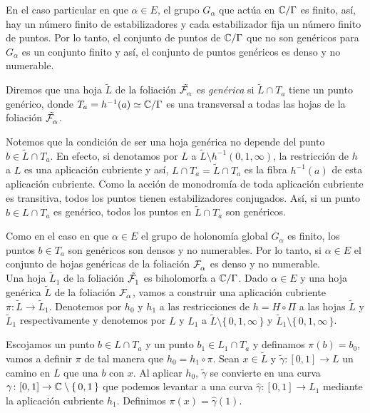 En el caso particular en que $\alpha\in E$, el grupo $G_{\alpha}$ que actúa en $\mathbb{C}/\Gamma$ es finito, así, hay un número finito de estabilizadores y cada estabilizador fija un número finito de puntos. Por lo tanto, el conjunto de puntos de $\mathbb{C}/\Gamma$ que no son genéricos para $G_{\alpha}$ es un conjunto finito y así, el conjunto de puntos genéricos es denso y no numerable.

\begin{defn}
\label{Def:HojaGenerica}
 Diremos que una hoja $\tilde{L}$ de la foliación $\tilde{\mathcal{F}^{\ }_{\alpha}}$ es \emph{genérica} si $\tilde{L}\cap T_{a}$ tiene un punto genérico, donde $T_{a}=h^{-1}(a)\simeq\mathbb{C}/\Gamma$ es una transversal a todas las hojas de la foliación $\tilde{\mathcal{F}^{\ }_{\alpha}}$.
\end{defn}

Notemos que la condición de ser una hoja genérica no depende del punto $b\in\tilde{L}\cap T_{a}$. En efecto, si denotamos por $L$ a $\tilde{L}\setminus h^{-1}(0,1,\infty)$, la restricción de $h$ a $L$ es una aplicación cubriente y así, $L\cap T_{a}=\tilde{L}\cap T_{a}$ es la fibra $h^{-1}(a)$ de esta aplicación cubriente. Como la acción de monodromía de toda aplicación cubriente es transitiva, todos los puntos tienen estabilizadores conjugados. Así, si un punto $b\in L\cap T_{a}$ es genérico, todos los puntos en $\tilde{L}\cap T_{a}$ son genéricos.

Como en el caso en que $\alpha\in E$ el grupo de holonomía global $G_{\alpha}$ es finito, los puntos $b\in T_{a}$ son genéricos son densos y no numerables. Por lo tanto, si $\alpha\in E$ el conjunto de hojas genéricas de la foliación $\mathcal{F}^{\ }_{\alpha}$ es denso y no numerable.\\

Una hoja $\tilde{L}_{1}$ de la foliación $\tilde{\mathcal{F}^{\ }_{1}}$ es biholomorfa a $\mathbb{C}/\Gamma$. Dado $\alpha\in E$ y una hoja genérica $\tilde{L}$ de la foliación $\mathcal{F}^{\ }_{\alpha}$, vamos a construir una aplicación cubriente $\pi\colon\tilde{L}\rightarrow\tilde{L}_{1}$. Denotemos por $h_{0}$ y $h_{1}$ a las restricciones de $h=H\circ\Pi$ a las hojas $\tilde{L}$ y $\tilde{L}_{1}$ respectivamente y denotemos por $L$ y $L_{1}$ a $\tilde{L}\setminus\{\, 0,1,\infty \, \}$ y $\tilde{L}_{1}\setminus\{\, 0,1,\infty \, \}$.

Escojamos un punto $b\in L\cap T_{a}$ y un punto $b_{1}\in L_{1}\cap T_{a}$ y definamos $\pi(b)=b_{0}$, vamos a definir $\pi$ de tal manera que $h_{0}=h_{1}\circ\pi$. Sean $x\in\tilde{L}$ y $\tilde{\gamma}\colon [0,1]\rightarrow L$ un camino en $L$ que una $b$ con $x$. Al aplicar $h_{0}$, $\tilde{\gamma}$ se convierte en una curva $\gamma\colon [0,1]\rightarrow\mathbb{C}\setminus\{\, 0,1\, \}$ que podemos levantar a una curva $\hat{\gamma}\colon [0,1]\rightarrow  L_{1}$ mediante la aplicación cubriente $h_{1}$. Definimos $\pi(x)=\hat{\gamma}(1)$.

